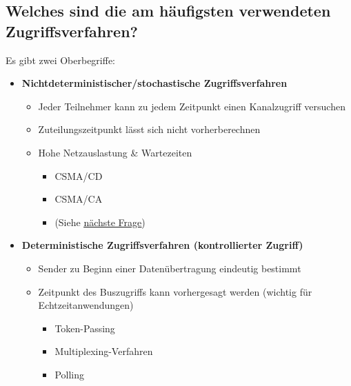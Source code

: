 \subsection*{Welches sind die am häufigsten verwendeten Zugriffsverfahren?}
Es gibt zwei Oberbegriffe:
\begin{itemize}
    \item \textbf{Nichtdeterministischer/stochastische Zugriffsverfahren}
    \begin{itemize}
        \item Jeder Teilnehmer kann zu jedem Zeitpunkt einen Kanalzugriff versuchen
        \item Zuteilungszeitpunkt lässt sich nicht vorherberechnen
        \item Hohe Netzauslastung \& Wartezeiten
        \begin{itemize}
            \item CSMA/CD
            \item CSMA/CA
            \item (Siehe \underline{\hyperref[sub:csma]{nächste Frage}})
        \end{itemize}
    \end{itemize}
    \item \textbf{Deterministische Zugriffsverfahren (kontrollierter Zugriff)}
    \begin{itemize}
        \item Sender zu Beginn einer Datenübertragung eindeutig bestimmt
        \item Zeitpunkt des Buszugriffs kann vorhergesagt werden (wichtig für Echtzeitanwendungen)
        \begin{itemize}
            \item Token-Passing
            \item Multiplexing-Verfahren
            \item Polling
        \end{itemize}
    \end{itemize}
\end{itemize}

